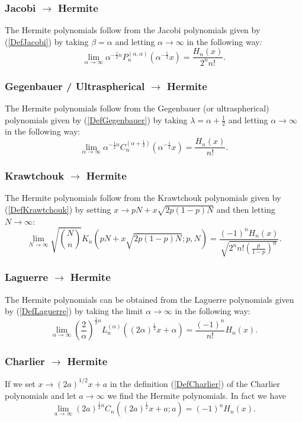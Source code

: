 \documentclass[envcountchap,graybox]{svmono}
\newcounter{rom}
\begin{document}
\subsubsection*{Jacobi $\rightarrow$ Hermite}
The Hermite polynomials follow from the Jacobi polynomials given by (\ref{DefJacobi}) by
taking $\beta=\alpha$ and letting $\alpha\rightarrow\infty$ in the following way:
$$\lim_{\alpha\rightarrow\infty}
\alpha^{-\frac{1}{2}n}P_n^{(\alpha,\alpha)}(\alpha^{-\frac{1}{2}}x)=\frac{H_n(x)}{2^nn!}.$$

\subsubsection*{Gegenbauer / Ultraspherical $\rightarrow$ Hermite}
The Hermite polynomials follow from the Gegenbauer (or ultraspherical) polynomials given by
(\ref{DefGegenbauer}) by taking $\lambda=\alpha+\frac{1}{2}$ and letting
$\alpha\rightarrow\infty$ in the following way:
$$\lim_{\alpha\rightarrow\infty}
\alpha^{-\frac{1}{2}n}C_n^{(\alpha+\frac{1}{2})}(\alpha^{-\frac{1}{2}}x)=\frac{H_n(x)}{n!}.$$

\subsubsection*{Krawtchouk $\rightarrow$ Hermite}
The Hermite polynomials follow from the Krawtchouk polynomials given by (\ref{DefKrawtchouk})
by setting $x\rightarrow pN+x\sqrt{2p(1-p)N}$ and then letting $N\rightarrow\infty$:
$$\lim_{N\rightarrow\infty}
\sqrt{\binom{N}{n}}K_n(pN+x\sqrt{2p(1-p)N};p,N)
=\frac{\displaystyle (-1)^nH_n(x)}{\displaystyle\sqrt{2^nn!\left(\frac{p}{1-p}\right)^n}}.$$

\subsubsection*{Laguerre $\rightarrow$ Hermite}
The Hermite polynomials can be obtained from the Laguerre polynomials given by
(\ref{DefLaguerre}) by taking the limit $\alpha\rightarrow\infty$ in the following way:
$$\lim_{\alpha\rightarrow\infty}
\left(\frac{2}{\alpha}\right)^{\frac{1}{2}n}
L_n^{(\alpha)}((2\alpha)^{\frac{1}{2}}x+\alpha)=\frac{(-1)^n}{n!}H_n(x).$$

\subsubsection*{Charlier $\rightarrow$ Hermite}
If we set $x\rightarrow (2a)^{1/2}x+a$ in the definition (\ref{DefCharlier})
of the Charlier polynomials and let $a\rightarrow\infty$ we find the Hermite
polynomials. In fact we have
$$\lim_{a\rightarrow\infty}
(2a)^{\frac{1}{2}n}C_n((2a)^{\frac{1}{2}}x+a;a)=(-1)^nH_n(x).$$
\end{document}
